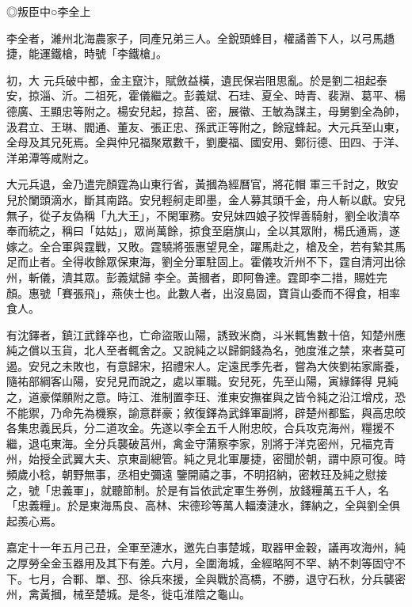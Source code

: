 
\begin{pinyinscope}

 ◎叛臣中○李全上



 李全者，濰州北海農家子，同產兄弟三人。全銳頭蜂目，權譎善下人，以弓馬趫捷，能運鐵槍，時號「李鐵槍」。



 初，大
 元兵破中都，金主竄汴，賦斂益橫，遺民保岩阻思亂。於是劉二祖起泰安，掠淄、沂。二祖死，霍儀繼之。彭義斌、石珪、夏全、時青、裴淵、葛平、楊德廣、王顯忠等附之。楊安兒起，掠莒、密，展徽、王敏為謀主，母舅劉全為帥，汲君立、王琳、閻通、董友、張正忠、孫武正等附之，餘寇蜂起。大元兵至山東，全母及其兄死焉。全與仲兄福聚眾數千，劉慶福、國安用、鄭衍德、田四、于洋、洋弟潭等咸附之。



 大元兵退，金乃遣完顏霆為山東行省，黃摑為經曆官，將花帽
 軍三千討之，敗安兒於闌頭滴水，斷其南路。安兒輕舸走即墨，金人募其頭千金，舟人斬以獻。安兒無子，從子友偽稱「九大王」，不閑軍務。安兒妹四娘子狡悍善騎射，劉全收潰卒奉而統之，稱曰「姑姑」，眾尚萬餘，掠食至磨旗山，全以其眾附，楊氏通焉，遂嫁之。全合軍與霆戰，又敗。霆驍將張惠望見全，躍馬赴之，槍及全，若有縶其馬足而止者。全得收餘眾保東海，劉全分軍駐固上。霍儀攻沂州不下，霆自清河出徐州，斬儀，潰其眾。彭義斌歸
 李全。黃摑者，即阿魯達。霆即李二措，賜姓完顏。惠號「賽張飛」，燕俠士也。此數人者，出沒島固，寶貨山委而不得食，相率食人。



 有沈鐸者，鎮江武鋒卒也，亡命盜販山陽，誘致米商，斗米輒售數十倍，知楚州應純之償以玉貨，北人至者輒舍之。又說純之以歸銅錢為名，弛度淮之禁，來者莫可遏。安兒之未敗也，有意歸宋，招禮宋人。定遠民季先者，嘗為大俠劉祐家廝養，隨祐部綱客山陽，安兒見而說之，處以軍職。安兒死，先至山陽，寅緣鐸得
 見純之，道豪傑願附之意。時江、淮制置李玨、淮東安撫崔與之皆令純之沿江增戍，恐不能禦，乃命先為機察，諭意群豪；敘復鐸為武鋒軍副將，辟楚州都監，與高忠皎各集忠義民兵，分二道攻金。先遂以李全五千人附忠皎，合兵攻克海州，糧援不繼，退屯東海。全分兵襲破莒州，禽金守蒲察李家，別將于洋克密州，兄福克青州，始授全武翼大夫、京東副總管。純之見北軍屢捷，密聞於朝，謂中原可復。時頻歲小稔，朝野無事，丞相史彌遠
 鑒開禧之事，不明招納，密敕玨及純之慰接之，號「忠義軍」，就聽節制。於是有旨依武定軍生券例，放錢糧萬五千人，名「忠義糧」。於是東海馬良、高林、宋德珍等萬人輻湊漣水，鐸納之，全與劉全俱起羨心焉。



 嘉定十一年五月己丑，全軍至漣水，邀先白事楚城，取器甲金穀，議再攻海州，純之厚勞全金玉器用及其下有差。六月，全圍海城，金經略阿不罕、納不刺等固守不下。七月，合鄆、單、邳、徐兵來援，全與戰於高橋，不勝，退守石秋，分兵襲密
 州，禽黃摑，械至楚城。是冬，徙屯淮陰之龜山。




\end{pinyinscope}
